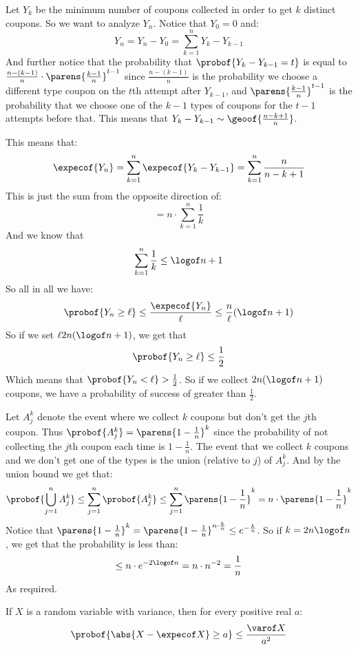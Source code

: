 \begin{solution}

	\begin{msecenumerate}[0pt]
		\mitem Let $Y_k$ be the minimum number of coupons collected in order to get $k$ distinct coupons.
			So we want to analyze $Y_n$.
			Notice that $Y_0=0$ and:
			\[ Y_n = Y_n - Y_0 = \sum_{k=1}^n Y_k - Y_{k-1} \]
			And further notice that the probability that $\probof{Y_k-Y_{k-1}=t}$ is equal to
			$\frac{n-(k-1)}n\cdot\parens{\frac{k-1}n}^{t-1}$ since $\frac{n-(k-1)}n$ is the probability we choose
			a different type coupon on the $t$th attempt after $Y_{k-1}$, and $\parens{\frac{k-1}n}^{t-1}$ is the
			probability that we choose one of the $k-1$ types of coupons for the $t-1$ attempts before that.
			This means that $Y_k-Y_{k-1}\sim\geoof{\frac{n-k+1}n}$.

			This means that:
			\[ \expecof{Y_n} = \sum_{k=1}^n\expecof{Y_k-Y_{k-1}} = \sum_{k=1}^n\frac{n}{n-k+1} \]
			This is just the sum from the opposite direction of:
			\[ = n\cdot\sum_{k=1}^n\frac1k \]
			And we know that
			\[ \sum_{k=1}^n\frac1k \leq \logof n+1 \]
			So all in all we have:
			\[ \probof{Y_n\geq\ell} \leq \frac{\expecof{Y_n}}\ell \leq \frac n\ell(\logof n+1) \]
			So if we set $\ell2n(\logof n+1)$, we get that
			\[ \probof{Y_n\geq\ell} \leq \frac12 \]
			Which means that $\probof{Y_n<\ell} > \frac12$.
			So if we collect $2n(\logof n+1)$ coupons, we have a probability of success of greater than $\frac12$.

		\mitem Let $A_j^k$ denote the event where we collect $k$ coupons but don't get the $j$th coupon.
			Thus $\probof{A_j^k}=\parens{1-\frac1n}^k$ since the probability of not collecting the $j$th coupon each
			time is $1-\frac1n$.
			The event that we collect $k$ coupons and we don't get one of the types is the union (relative to $j$) of
			$A_j^k$.
			And by the union bound we get that:
			\[ \probof{\bigcup_{j=1}^n A_j^k} \leq \sum_{j=1}^n \probof{A_j^k} \leq \sum_{j=1}^n\parens{1-\frac1n}^k
			= n\cdot\parens{1-\frac1n}^k \]
			Notice that $\parens{1-\frac1n}^k = \parens{1-\frac1n}^{n\cdot\frac kn}\leq e^{-\frac kn}$.
			So if $k=2n\logof n$, we get that the probability is less than:
			\[ \leq n\cdot e^{-2\logof n} = n\cdot n^{-2} = \frac1n \]
			As required.
	\end{msecenumerate}

\end{solution}

\begin{thrm*}

	If $X$ is a random variable with variance, then for every positive real $a$:
	\[ \probof{\abs{X-\expecof X}\geq a} \leq \frac{\varof X}{a^2} \]

\end{thrm*}

